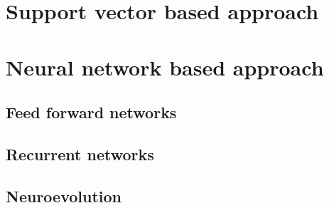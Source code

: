 \section{Support vector based approach}

\section{Neural network based approach}

\subsection{Feed forward networks}
\subsection{Recurrent networks}
\subsection{Neuroevolution}

